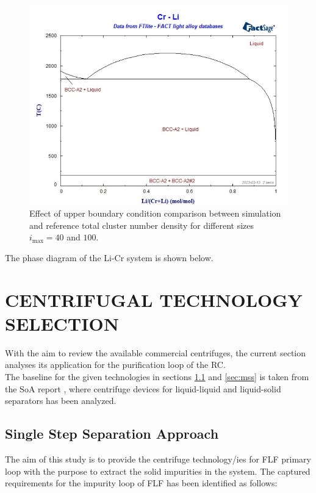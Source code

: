 	
\begin{figure}[H]
    \centering
    \includegraphics[width=0.9\linewidth]{Li_Cr_phase_diagram.png}
    \caption{Effect of upper boundary condition comparison between simulation and reference total cluster number density for different sizes $i_{\text{max}} = 40$ and $100$.}
    \label{fig:cr_li_diagram}
\end{figure}

The phase diagram of the Li-Cr system is shown below.

\newpage

\section{CENTRIFUGAL TECHNOLOGY SELECTION} \label{sec:eng}%
With the aim to review the available commercial centrifuges, the current section analyses its application for the purification loop of the RC. \\

\noindent The baseline for the given technologies in sections \ref{sec:sss} and \ref{sec:mss} is taken from the SoA report \cite{SoA}, where centrifuge devices for liquid-liquid and liquid-solid separators has been analyzed. 

\subsection{Single Step Separation Approach}\label{sec:sss}
The aim of this study is to provide the centrifuge technology/ies for FLF primary loop with the purpose to extract the solid impurities in the system. The captured requirements for the impurity loop of FLF has been identified as follows:

